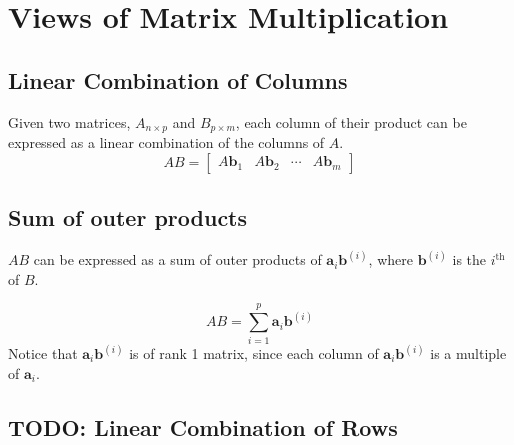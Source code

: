 \section{Views of Matrix Multiplication}
    \subsection{Linear Combination of Columns}
    Given two matrices, $A_{n \times p}$ and $B_{p \times m}$, each column of their product can be expressed as a linear combination of the columns of $A$.
    \begin{equation}
        AB = \begin{bmatrix}
            A\mathbf{b}_1 & A\mathbf{b}_2 & \cdots &  A\mathbf{b}_m
        \end{bmatrix}
    \end{equation}

    \subsection{Sum of outer products}
    $AB$ can be expressed as a sum of outer products of $\mathbf{a}_i \mathbf{b}^{(i)}$, where $\mathbf{b}^{(i)}$ is the $i^{\text{th}}$ of $B$.

    \begin{equation}\label{sum-outer}
        AB = \sum_{i = 1}^{p} \mathbf{a}_i \mathbf{b}^{(i)}
    \end{equation}
    Notice that $\mathbf{a}_i \mathbf{b}^{(i)}$ is of rank 1 matrix, since each column of $\mathbf{a}_i \mathbf{b}^{(i)}$ is a multiple of $\mathbf{a}_i$.

    \subsection{TODO: Linear Combination of Rows}